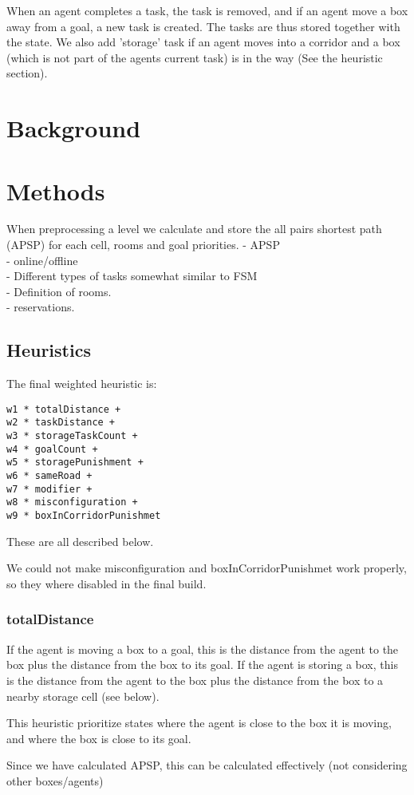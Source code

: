 \documentclass[letterpaper]{article}
\begin{document}
When an agent completes a task, the task is removed, and if an agent move a box away from
a goal, a new task is created. The tasks are thus stored together with the state.
We also add 'storage' task if an agent moves into a corridor and a box (which is not
part of the agents current task) is in the way (See the heuristic section).

\section{Background}
\section{Methods}
When preprocessing a level we calculate and store the all pairs shortest path (APSP)
for each cell, rooms and goal priorities.
- APSP\\
- online/offline\\
- Different types of tasks somewhat similar to FSM\\
- Definition of rooms.\\
- reservations.\\
\subsection{Heuristics}
The final weighted heuristic is:
\begin{verbatim}
w1 * totalDistance +
w2 * taskDistance +
w3 * storageTaskCount +
w4 * goalCount +
w5 * storagePunishment +
w6 * sameRoad +
w7 * modifier +
w8 * misconfiguration +
w9 * boxInCorridorPunishmet
\end{verbatim}
These are all described below.

We could not make misconfiguration and boxInCorridorPunishmet
work properly, so they where disabled in the final build.
\subsubsection{totalDistance}
If the agent is moving a box to a goal, this is the distance from the agent
to the box plus the distance from the box to its goal. If the agent is storing
a box, this is the distance from the agent to the box plus the distance from the
box to a nearby storage cell (see below).

This heuristic prioritize states where the agent is close to the box it is moving,
and where the box is close to its goal.

Since we have calculated APSP, this can be calculated effectively (not considering other boxes/agents)\\
\end{document}
